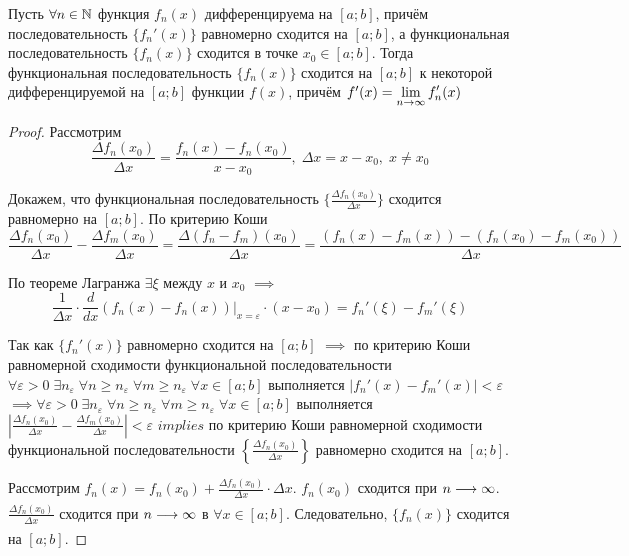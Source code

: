 \begin{theorem}
    Пусть $\forall n \in \mathbb{N}$ функция $f_n(x)$ дифференцируема на $[a; b]$,
    причём последовательность $\{ f_n'(x) \}$ равномерно сходится на $[a; b]$,
    а функциональная последовательность $\{ f_n(x) \}$ сходится в точке
    $x_0 \in [a; b]$. Тогда функциональная последовательность $\{ f_n(x) \}$
    сходится на $[a; b]$ к некоторой дифференцируемой на $[a; b]$ 
    функции $f(x)$, причём $f'(x) = \displaystyle\lim_{n \to \infty} f_n' (x)$
\end{theorem}
\begin{proof}
    Рассмотрим
    \[
        \frac{\Delta f_n(x_0)}{\Delta x}
        = \frac{f_n(x) - f_n(x_0)}{x - x_0}, 
        \; \Delta x = x - x_0, \; x \ne x_0
    \]

    Докажем, что функциональная последовательность 
    $\{ \frac{\Delta f_n(x_0)}{\Delta x} \}$ сходится равномерно на $[a; b]$.
    По критерию Коши
    \[
        \frac{\Delta f_n(x_0)}{\Delta x} - \frac{\Delta f_m(x_0)}{\Delta x}
        = \frac{\Delta (f_n - f_m)(x_0)}{\Delta x}
        = \frac{(f_n(x) - f_m(x)) - (f_n(x_0) - f_m(x_0))}{\Delta x}
    \]

    По теореме Лагранжа $\exists \xi$ между $x$ и $x_0$ $\implies$
    \[
        \frac{1}{\Delta x} \cdot 
        \frac{d}{dx} (f_n (x) - f_n(x)) \Big|_{x=\varepsilon} \cdot (x - x_0)
        = f_n'(\xi) - f_m'(\xi)
    \]

    Так как $\{ f_n'(x) \}$ равномерно сходится на $[a; b]$ $\implies$
    по критерию Коши равномерной сходимости функциональной последовательности
    $\forall \varepsilon > 0 \; \exists n_\varepsilon \;
    \forall n \geq n_\varepsilon \; \forall m \geq n_\varepsilon \;
    \forall x \in [a; b]$ выполняется $|f_n'(x) - f_m'(x)| < \varepsilon$
    $\implies \forall \varepsilon > 0 \; \exists n_\varepsilon \;
    \forall n \geq n_\varepsilon \; \forall m \geq n_\varepsilon \;
    \forall x \in [a; b]$ выполняется
    $\left| \frac{\Delta f_n(x_0)}{\Delta x} - \frac{\Delta f_m(x_0)}{\Delta x} \right| < \varepsilon$
    $implies$ по критерию Коши равномерной сходимости функциональной
    последовательности $\left\{ \frac{\Delta f_n(x_0)}{\Delta x} \right\}$
    равномерно сходится на $[a; b]$.

    Рассмотрим $f_n(x) = f_n(x_0) + \frac{\Delta f_n(x_0)}{\Delta x} \cdot \Delta x$.
    $f_n(x_0)$ сходится при $n \underset{}{\longrightarrow} \infty$. 
    $\frac{\Delta f_n(x_0)}{\Delta x}$ сходится при $n \underset{}{\longrightarrow} \infty$ в
    $\forall x \in [a; b]$.
    Следовательно, $\{ f_n(x) \}$ сходится на $[a; b]$.


\end{proof}
